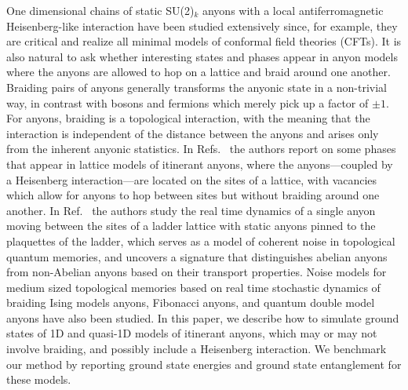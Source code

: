 \documentclass[aps,reprint,superscriptaddress,amsmath,amssymb,amsfonts,prb]{revtex4-1}
\begin{document}
One dimensional chains of static SU(2)$_k$ anyons with a local antiferromagnetic Heisenberg-like interaction have been studied extensively since, for example, they are critical and realize all minimal models of conformal field theories (CFTs).\cite{Trebst2008} It is also natural to ask whether interesting states and phases appear in anyon models where the anyons are allowed to hop on a lattice and braid around one another. Braiding pairs of anyons generally transforms the anyonic state in a non-trivial way, in contrast with bosons and fermions which merely pick up a factor of $\pm 1$. For anyons, braiding is a topological interaction, with the meaning that the interaction is independent of the distance between the anyons and arises only from the inherent anyonic statistics. In Refs.~ the authors report on some phases that appear in lattice models of itinerant anyons, where the anyons---coupled by a Heisenberg interaction---are located on the sites of a lattice, 
with vacancies which allow for anyons to hop between sites but without braiding around one 
another. In Ref.~ the authors study the real time dynamics of a single anyon moving between the sites of a ladder lattice with static anyons pinned to the plaquettes of the ladder, which serves as a model of coherent noise in topological quantum memories, and uncovers a signature that distinguishes abelian anyons from non-Abelian anyons based on their transport properties. Noise models for medium sized topological memories based on real time {stochastic} dynamics of braiding Ising models anyons,\cite{Brell:2014ly} Fibonacci anyons,\cite{Burton} and quantum double model anyons \cite{Wootton:2014ve} have also been studied. In this paper, we describe how to simulate ground states of 1D and quasi-1D models of itinerant anyons, which may or may not involve braiding, and possibly include a Heisenberg interaction. We benchmark our method by reporting ground state energies and ground state entanglement for these models.
\end{document}
